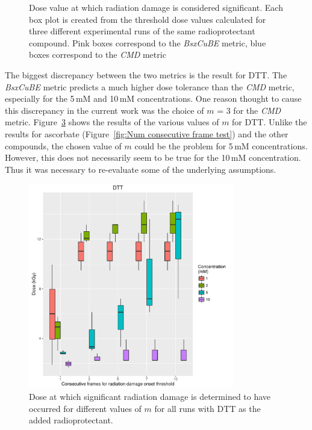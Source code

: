 \begin{figure}
\begin{subfigure}[b]{0.45\textwidth}
            \caption{}
            \label{fig:SAXS Metric comparison - 10mM}
    \end{subfigure}
    \caption{Dose value at which radiation damage is considered significant. Each box plot is created from the threshold dose values calculated for three different experimental runs of the same radioprotectant compound. Pink boxes correspond to the \textit{BsxCuBE} metric, blue boxes correspond to the \textit{CMD} metric}
    \label{fig:SAXS Metric comparison}
\end{figure}

The biggest discrepancy between the two metrics is the result for DTT.
The \textit{BsxCuBE} metric predicts a much higher dose tolerance than the \textit{CMD} metric, especially for the 5$\,$mM and 10$\,$mM concentrations.
One reason thought to cause this discrepancy in the current work was the choice of $m$ = 3 for the \textit{CMD} metric.
Figure~\ref{fig:Num consec frames - DTT} shows the results of the various values of $m$ for DTT.
Unlike the results for ascorbate (Figure~\ref{fig:Num consecutive frame test}) and the other compounds, the chosen value of $m$ could be the problem for 5$\,$mM concentrations.
However, this does not necessarily seem to be true for the 10$\,$mM concentration.
Thus it was necessary to re-evaluate some of the underlying assumptions.
\begin{figure}
    \centering
    \includegraphics[width=0.8\textwidth]{figures/saxs/DTT_Num_consec_fr_comp.pdf}
    \caption{Dose at which significant radiation damage is determined to have occurred for different values of $m$ for all runs with DTT as the added radioprotectant.}
    \label{fig:Num consec frames - DTT}
\end{figure}

